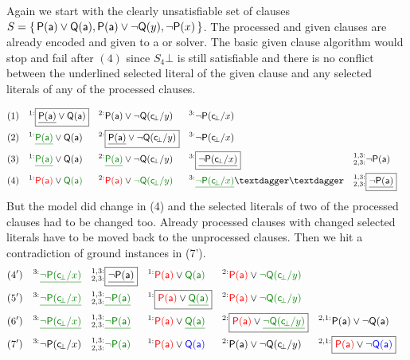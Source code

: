 \begin{example}
	Again we start with the clearly unsatisfiable set of clauses
\( S=\{ \, \mathsf{P}(\mathsf{a})\lor\mathsf{Q}(\mathsf{a}), \mathsf{P}(\mathsf{a})\lor\lnot\mathsf{Q}(y), \lnot\mathsf{P}(x) \, \} \).
	The processed and given clauses are already encoded and
	given to a \SAT{} or \SMT{} solver.
	The basic given clause algorithm would stop and fail after \( (4) \)
	since \( S_4\bot \) is still satisfiable and there is no conflict between the underlined selected literal of the given clause
	and any selected literals of any of the processed clauses.

	\begin{align*}
	(1)\quad^{1:}&\boxed{\underline{\mP(\ma)}\lor\mQ(\ma)}
	& ^{2:}&\mP(\ma)\lor\lnot\mQ(\consbot/y)
	& ^{3:}&\lnot\mP(\consbot/x)
	\\
	(2)\quad^{1:}&{\colHi\underline{\mP(\ma)}}\lor\mQ(\ma)
	& ^{2:}&\boxed{\underline{\mP(\ma)}\lor\lnot\mQ(\consbot/y)}
	& ^{3:}&\lnot\mP(\consbot/x)
	\\
	(3)\quad^{1:}&{\colHi\underline{\mP(\ma)}}\lor\mQ(\ma)
	& ^{2:}&{\colHi\underline{\mP(\ma)}}\lor\lnot\mQ(\consbot/y)
	& ^{3:}&\boxed{\underline{\lnot\mP(\consbot/x)}}
	& ^{1,3:}_{2,3:}&\lnot\mP(\ma)
	\\
	(4)\quad
	^{1:}&{\colLo\mP(\ma)}\lor\colHi\mQ(\ma)
	& ^{2:}&{\colLo\mP(\ma)}\lor\colHi\lnot\mQ(\consbot/y)
	& ^{3:}&{\colHi\underline{\lnot\mP(\consbot/x)}}††
	& ^{1,3:}_{2,3:}&\boxed{\underline{\lnot\mP(\ma)}}
	\end{align*}
	But the model did change in (4) and the selected literals of two of the processed clauses had to be changed too.
	Already processed clauses with changed selected literals have to be moved back to the unprocessed clauses.
	Then we hit a contradiction of ground instances in (7').
	\begin{align*}
	(4')\quad^{3:}&{\underline{\colHi\lnot\mP(\consbot/x)}}
	& ^{1,3:}_{2,3:}&\boxed{\underline{\lnot\mP(\ma)}}
	& ^{1:}&{\colLo\mP(\ma)}\lor\colHi\mQ(\ma)
	& ^{2:}&{\colLo\mP(\ma)}\lor\colHi\lnot\mQ(\consbot/y)
	\\
	(5')\quad^{3:}&{\underline{\colHi\lnot\mP(\consbot/x)}}
	& ^{1,3:}_{2,3:}&\colHi\underline{\lnot\mP(\ma)}
	& ^{1:}&\boxed{{\colLo\mP(\ma)}\lor\colHi\underline{\mQ(\ma)}}
	& ^{2:}&{\colLo\mP(\ma)}\lor\colHi\lnot\mQ(\consbot/y)
	\\
	(6')\quad^{3:}&{\colHi\underline{\lnot\mP(\consbot/x)}}
	& ^{1,3:}_{2,3:}&\colHi\underline{\lnot\mP(\ma)}
	& ^{1:}&{\colLo\mP(\ma)}\lor\colHi\underline{\mQ(\ma)}
	& ^{2:}&\boxed{{\colLo\mP(\ma)}\lor\colHi\underline{\lnot\mQ(\consbot/y)}}
	& ^{2,1:}&\mP(\ma)\lor\lnot\mQ(\ma)
	\\
	(7')\quad^{3:}&{\lnot\mP(\consbot/x)}
	& ^{1,3:}_{2,3:}&\colHi\lnot\mP(\tikzmark{NP}\ma)
	& ^{1:}&{\colLo\mP(\tikzmark{PP}\ma)}\lor\colN\mQ(\tikzmark{PQ}\ma)
	& ^{2:}&{\mP(\ma)\lor\lnot\mQ(\consbot/y)}
	& ^{2,1:}&\boxed{{\colLo\mP(\tikzmark{PA}\ma)}\lor\colN\lnot\mQ(\tikzmark{NQ}\ma)}
	\end{align*}


\end{example}
